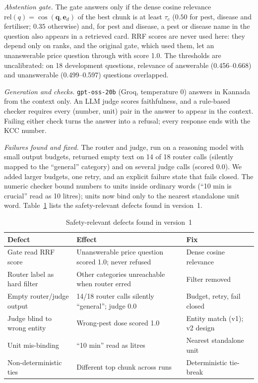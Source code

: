 \documentclass[conference]{IEEEtran}
\begin{document}
\textit{Abstention gate.} The gate answers only if the dense cosine relevance
$\mathrm{rel}(q)=\cos(\mathbf{q},\mathbf{e}_d)$ of the best chunk is at least $\tau_c$
($0.50$ for pest, disease and fertiliser; $0.35$ otherwise) and, for pest and disease, a
pest or disease name in the question also appears in a retrieved card. RRF scores are never
used here: they depend only on ranks, and the original gate, which used them, let an
unanswerable price question through with score 1.0. The thresholds are uncalibrated: on 18
development questions, relevance of answerable (0.456--0.668) and unanswerable
(0.499--0.597) questions overlapped.

\textit{Generation and checks.} \texttt{gpt-oss-20b} (Groq, temperature 0) answers in Kannada
from the context only. An LLM judge scores faithfulness, and a rule-based checker requires
every (number, unit) pair in the answer to appear in the context. Failing either check
turns the answer into a refusal; every response ends with the KCC number.

\textit{Failures found and fixed.} The router and judge, run on a reasoning model with small
output budgets, returned empty text on 14 of 18 router calls (silently mapped to the
``general'' category) and on several judge calls (scored 0.0). We added larger budgets, one
retry, and an explicit failure state that fails closed. The numeric checker bound numbers to
units inside ordinary words (``10 min is crucial'' read as 10 litres); units now bind only to
the nearest standalone unit word. Table~\ref{tab:defects} lists the safety-relevant defects
found in version~1.

\begin{table}[t]
\centering
\caption{Safety-relevant defects found in version~1}
\label{tab:defects}
\footnotesize
\begin{tabular}{p{2.2cm}p{2.9cm}p{2.4cm}}
\toprule
Defect & Effect & Fix\\
\midrule
Gate read RRF score & Unanswerable price question scored 1.0; never refused & Dense cosine relevance\\
Router label as hard filter & Other categories unreachable when router erred & Filter removed\\
Empty router/judge output & 14/18 router calls silently ``general''; judge 0.0 & Budget, retry, fail closed\\
Judge blind to wrong entity & Wrong-pest dose scored 1.0 & Entity match (v1); v2 design\\
Unit mis-binding & ``10 min'' read as litres & Nearest standalone unit\\
Non-deterministic ties & Different top chunk across runs & Deterministic tie-break\\
\bottomrule
\end{tabular}
\end{table}
\end{document}
